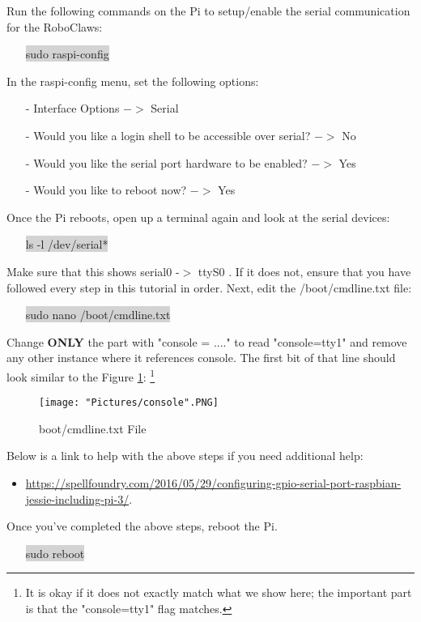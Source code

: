 \documentclass[12pt]{article}
\begin{document}
\noindent Run the following commands on the Pi to setup/enable the serial communication for the RoboClaws:
\begin{itemize}
	\item[] \colorbox{lightgray}{sudo raspi-config}
\end{itemize}

\noindent In the raspi-config menu, set the following options:
\begin{itemize}
	\item[-]  Interface Options $-> $ Serial 
	\item[-] Would you like a login shell to be accessible over serial? $->$ No
	\item[-] Would you like the serial port hardware to be enabled? $->$ Yes
	\item[-] Would you like to reboot now? $->$ Yes
\end{itemize} 
\noindent Once the Pi reboots, open up a terminal again and look at the serial devices:
\begin{itemize}
	\item[] \colorbox{lightgray}{ls -l /dev/serial*}
\end{itemize}
Make sure that this shows serial0 -$>$ ttyS0 . If it does not, ensure that you have followed every step in this tutorial in order. Next, edit the /boot/cmdline.txt file:
\begin{itemize}
	\item [] \colorbox{lightgray}{sudo nano /boot/cmdline.txt}
\end{itemize}

\noindent Change \textbf{ONLY} the part with "console = ...." to read "console=tty1" and remove any other instance where it references console. The first bit of that line should look similar to the Figure \ref{console}: \footnote{It is okay if it does not exactly match what we show here; the important part is that the "console=tty1" flag matches.}

\begin{figure}[H]
 	\centering
	\texttt{[image: "Pictures/console".PNG]}
 	\caption{boot/cmdline.txt File}
	\label{console}
\end{figure}

\noindent Below is a link to help with the above steps if you need additional help:
\begin{itemize}
	\item \href{https://spellfoundry.com/2016/05/29/configuring-gpio-serial-port-raspbian-jessie-including-pi-3/}{https://spellfoundry.com/2016/05/29/configuring-gpio-serial-port-raspbian-jessie-including-pi-3/}. 
\end{itemize}
\noindent Once you've completed the above steps, reboot the Pi.
\begin{itemize}
	\item[] \colorbox{lightgray}{sudo reboot}
\end{itemize}
\end{document}
